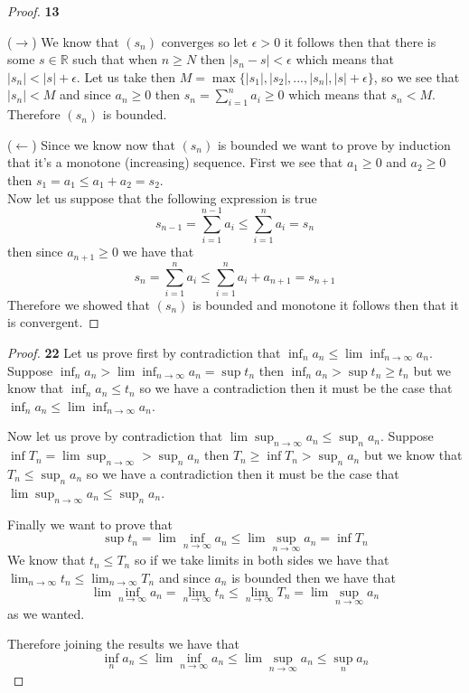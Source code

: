 \documentclass[11pt]{article}
\newcommand{\R}{\mathbb{R}}
\theoremstyle{definition}
\begin{document}
\cleardoublepage
    \begin{proof}{\textbf{13}}

        ($\rightarrow$) We know that $(s_n)$ converges so let $\epsilon > 0$ it follows
        then that there is some $s \in \R$ such that when $n\geq N$ then
        $|s_n - s|< \epsilon$ which means that $|s_n| < |s| + \epsilon$.
        Let us take then $M = \max\{|s_1|, |s_2|, ..., |s_n|, |s|+\epsilon \}$, so we 
        see that $|s_n| < M$ and since $a_n \geq 0$ then
        $s_n = \sum_{i=1}^{n} a_i \geq 0$ which means that $s_n < M$.
        Therefore $(s_n)$ is bounded.
        
        ($\leftarrow$) Since we know now that $(s_n)$ is bounded we want to prove by
        induction that it's a monotone (increasing) sequence.
        First we see that $a_1 \geq 0$ and $a_2 \geq 0$ then
        $s_1 = a_1 \leq a_1 + a_2 = s_2$.\\
        Now let us suppose that the following expression is true
        $$s_{n-1} = \sum_{i=1}^{n-1} a_i \leq \sum_{i=1}^{n} a_i = s_n$$
        then since $a_{n+1} \geq 0$ we have that 
        $$s_{n} = \sum_{i=1}^{n} a_i \leq \sum_{i=1}^{n} a_i + a_{n+1} = s_{n+1}$$
        Therefore we showed that $(s_n)$ is bounded and monotone it follows then that
        it is convergent.
    \end{proof}
    \begin{proof}{\textbf{22}}
        Let us prove first by contradiction that $\inf_n a_n \leq \lim \inf_{n \to \infty} a_n$.
        Suppose $\inf_n a_n > \lim \inf_{n \to \infty} a_n = \sup t_n$ then
        $\inf_n a_n > \sup t_n \geq t_n$ but we know that $\inf_n a_n \leq t_n$ so we
        have a contradiction then it must be the case that
        $\inf_n a_n \leq \lim \inf_{n \to \infty} a_n$.

        Now let us prove by contradiction that $\lim \sup_{n \to \infty} a_n \leq \sup_n a_n$.
        Suppose $\inf T_n = \lim \sup_{n \to \infty} > \sup_n a_n$ then
        $T_n \geq \inf T_n >\sup_n a_n$ but we know that $T_n \leq \sup_n a_n$ so we
        have a contradiction then it must be the case that
        $\lim \sup_{n \to \infty} a_n \leq \sup_n a_n$.

        Finally we want to prove that
        $$\sup t_n =\lim \inf_{n \to \infty} a_n \leq \lim \sup_{n \to \infty} a_n = \inf T_n$$
        We know that $t_n \leq T_n$ so if we take limits in both sides we have that
        $\lim_{n \to \infty} t_n \leq \lim_{n \to \infty}T_n$ and since $a_n$ is
        bounded then we have that
        $$\lim \inf_{n \to \infty} a_n = \lim_{n \to \infty} t_n \leq 
        \lim_{n \to \infty}T_n = \lim \sup_{n \to \infty} a_n$$
        as we wanted.

        Therefore joining the results we have that
        $$\inf_n a_n \leq \lim \inf_{n \to \infty} a_n \leq \lim \sup_{n \to \infty} a_n \leq \sup_n a_n$$
    \end{proof}
\end{document}
